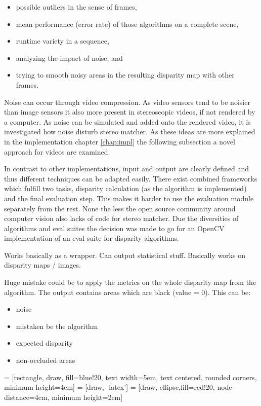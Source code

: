 \begin{itemize}
  \item possible outliers in the sense of frames,
  \item mean performance (error rate) of those algorithms on a complete scene,
  \item runtime variety in a sequence,
  \item analyzing the impact of noise, and
  \item trying to smooth noisy areas in the resulting disparity map with other frames.
\end{itemize}

\noindent Noise can occur through video compression.
As video sensors tend to be noisier than image sensors it also more present in stereoscopic videos, if not rendered by a computer.
As noise can be simulated and added onto the rendered video, it is investigated how noise disturb stereo matcher.
As these ideas are more explained in the implementation chapter \ref{chap:impl} the following subsection a novel approach for videos are examined.

In contrast to other implementations, input and output are clearly defined and thus different techniques can be adapted easily.
There exist combined frameworks which fulfill two tasks, disparity calculation (as the algorithm is implemented) and the final evaluation step.
This makes it harder to use the evaluation module separately from the rest.
None the less the open source community around computer vision also lacks of code for stereo matcher.
Due the diversities of algorithms and eval suites the decision was made to go for an OpenCV implementation of an eval suite for disparity algorithms.

Works basically as a wrapper. Can output statistical stuff. Basically works on disparity maps / images.

Huge mistake could be to apply the metrics on the whole disparity map from the algorithm. The output contains areas which are black (value = 0). This can be:

\begin{itemize}
  \item noise
  \item mistaken be the algorithm
  \item expected disparity
  \item non-occluded areas
\end{itemize}

 = [rectangle, draw, fill=blue!20,
    text width=5em, text centered, rounded corners, minimum height=4em]
 = [draw, -latex']
 = [draw, ellipse,fill=red!20, node distance=4cm,
    minimum height=2em]

